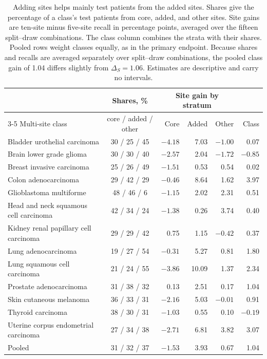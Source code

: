 \begin{table}[htbp]
\centering
\small
\renewcommand{\arraystretch}{1.1}
\begin{tabular}{@{}lcrrrr@{}}
\toprule
 & Shares, \% & \multicolumn{3}{c}{Site gain by stratum} & \\
\cmidrule(lr){3-5}
Multi-site class & core / added / other & Core & Added & Other & Class \\
\midrule
Bladder urothelial carcinoma & 30 / 25 / 45 & $-4.18$ & 7.03 & $-1.00$ & 0.07 \\
Brain lower grade glioma & 30 / 30 / 40 & $-2.57$ & 2.04 & $-1.72$ & $-0.85$ \\
Breast invasive carcinoma & 25 / 26 / 49 & $-1.51$ & 0.53 & 0.54 & 0.02 \\
Colon adenocarcinoma & 29 / 42 / 29 & $-0.46$ & 8.64 & 1.62 & 3.97 \\
Glioblastoma multiforme & 48 / 46 / 6 & $-1.15$ & 2.02 & 2.31 & 0.51 \\
Head and neck squamous cell carcinoma & 42 / 34 / 24 & $-1.38$ & 0.26 & 3.74 & 0.40 \\
Kidney renal papillary cell carcinoma & 29 / 29 / 42 & 0.75 & 1.15 & $-0.42$ & 0.37 \\
Lung adenocarcinoma & 19 / 27 / 54 & $-0.31$ & 5.27 & 0.81 & 1.80 \\
Lung squamous cell carcinoma & 21 / 24 / 55 & $-3.86$ & 10.09 & 1.37 & 2.34 \\
Prostate adenocarcinoma & 31 / 38 / 32 & 0.13 & 2.51 & 0.17 & 1.04 \\
Skin cutaneous melanoma & 36 / 33 / 31 & $-2.16$ & 5.03 & $-0.01$ & 0.91 \\
Thyroid carcinoma & 38 / 30 / 31 & $-1.03$ & 0.55 & 0.10 & $-0.19$ \\
Uterine corpus endometrial carcinoma & 27 / 34 / 38 & $-2.71$ & 6.81 & 3.82 & 3.07 \\
\midrule
Pooled & 31 / 32 / 37 & $-1.53$ & 3.93 & 0.67 & 1.04 \\
\bottomrule
\end{tabular}
\caption{Adding sites helps mainly test patients from the added sites. Shares give the percentage of a class's test patients from core, added, and other sites. Site gains are ten-site minus five-site recall in percentage points, averaged over the fifteen split--draw combinations. The class column combines the strata with their shares. Pooled rows weight classes equally, as in the primary endpoint. Because shares and recalls are averaged separately over split--draw combinations, the pooled class gain of 1.04 differs slightly from $\Delta_S=1.06$. Estimates are descriptive and carry no intervals.}
\label{tab:strata}
\end{table}

